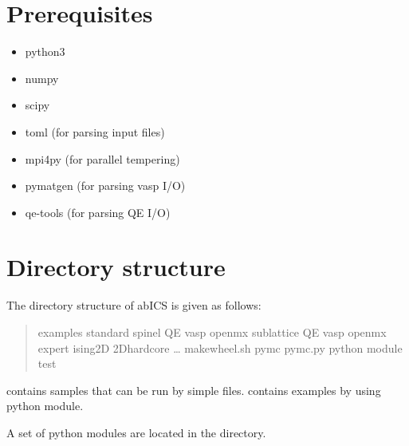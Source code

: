 \documentclass[letterpaper,10pt,english]{sphinxmanual}
\begin{document}
\section{Prerequisites}
\label{\detokenize{install/install:prerequisites}}\begin{itemize}
\item {} 
python3

\item {} 
numpy

\item {} 
scipy

\item {} 
toml (for parsing input files)

\item {} 
mpi4py (for parallel tempering)

\item {} 
pymatgen (for parsing vasp I/O)

\item {} 
qe-tools (for parsing QE I/O)

\end{itemize}


\section{Directory structure}
\label{\detokenize{install/install:directory-structure}}
The directory structure of abICS is given as follows:
\begin{quote}

\begin{sphinxVerbatim}[commandchars=\\\{\}]
 \PYGZhy{} examples
    \PYGZhy{} standard
        \PYGZhy{} spinel
            \PYGZhy{} QE
            \PYGZhy{} vasp
            \PYGZhy{} openmx
        \PYGZhy{} sub\PYGZhy{}lattice
            \PYGZhy{} QE
            \PYGZhy{} vasp
            \PYGZhy{} openmx
    \PYGZhy{} expert
        \PYGZhy{} ising2D
        \PYGZhy{} 2D\PYGZus{}hardcore
        …
\PYGZhy{} make\PYGZus{}wheel.sh
\PYGZhy{} py\PYGZus{}mc
    \PYGZhy{} pymc.py
    \PYGZhy{} python module
\PYGZhy{} test
\end{sphinxVerbatim}
\end{quote}

 contains samples that can be run by simple files.
 contains examples by using python module.

A set of python modules are located in the  directory.
\end{document}
